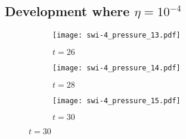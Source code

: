 \subsection{Development where $\eta=10^{-4}$}

\begin{figure}[t]
  \centering
    \begin{subfigure}{0.32\textwidth}
      \texttt{[image: swi-4\_pressure\_13.pdf]}
      \caption{$t=26$}
      \label{fig:swi-4_pressure_13}
    \end{subfigure}
    \hfill
    \begin{subfigure}{0.32\textwidth}
      \texttt{[image: swi-4\_pressure\_14.pdf]}
      \caption{$t=28$}
      \label{fig:swi-4_pressure_14}
    \end{subfigure}
    \hfill
    \begin{subfigure}{0.32\textwidth}
      \texttt{[image: swi-4\_pressure\_15.pdf]}
      \caption{$t=30$}
      \label{fig:swi-4_pressure_15}
    \end{subfigure}
\label{fig:kink_pressure_slices-4}%
\end{figure}

